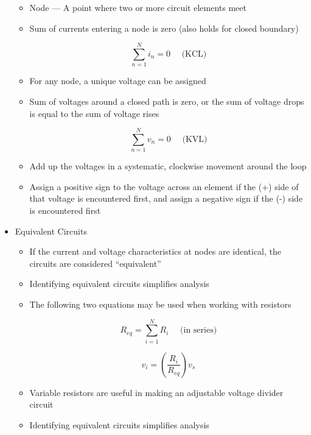 \begin{itemize}
\begin{itemize}
      \item Node — A point where two or more circuit elements meet

      \item Sum of currents entering a node is zero (also holds for closed boundary)

        $$\boxed{\sum_{n=1}^N i_n=0\,\,\,\,\,\,\,\,\text{(KCL)}}$$

      \item For any node, a unique voltage can be assigned

      \item Sum of voltages around a closed path is zero, or the sum of voltage drops is equal to the sum of voltage rises

        $$\boxed{\sum_{n=1}^N v_n=0\,\,\,\,\,\,\,\,\text{(KVL)}}$$

      \item Add up the voltages in a systematic, clockwise movement around the loop

      \item Assign a positive sign to the voltage across an element if the (+) side of that voltage is encountered first, and assign a negative sign if the (-) side is encountered first

    \end{itemize}

  \item Equivalent Circuits

    \begin{itemize}

      \item If the current and voltage characteristics at nodes are identical, the circuits are considered ``equivalent''

      \item Identifying equivalent circuits simplifies analysis

      \item The following two equations may be used when working with resistors

        $$\boxed{R_{eq}=\sum_{i=1}^N R_i\,\,\,\,\,\,\,\,\text{(in series)}}$$

        $$\boxed{v_i=\left( \frac{R_i}{R_{eq}} \right)v_s}$$

      \item Variable resistors are useful in making an adjustable voltage divider circuit

      \item Identifying equivalent circuits simplifies analysis


\end{itemize}
\end{itemize}
